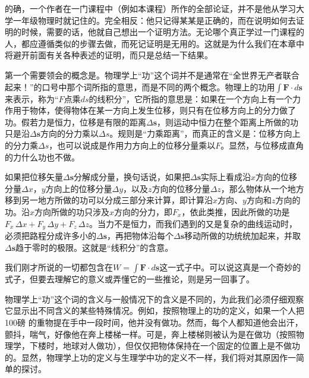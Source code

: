 \documentclass[12pt,oneside]{book}
\providecommand{\FLPvec}[1]{\boldsymbol{#1}}
\providecommand{\FLPF}[0]{\FLPvec{F}}
\providecommand{\FLPs}[0]{\FLPvec{s}}
\begin{document}
的确，一个作者在一门课程中（例如本课程）所作的全部论证，并不是他从学习大学一年级物理时就记住的。完全相反：他只记得某某是正确的，而在说明如何去证明的时候，需要的话，他就自己想出一个证明方法。无论哪个真正学过一门课程的人，都应遵循类似的步骤去做，而死记证明是无用的。这就是为什么我们在本章中将避开前面有关各种表述的证明，而只是总结一下结果。


第一个需要领会的概念是。物理学上“功”这个词并不是通常在“全世界无产者联合起来！”的口号中那个词所指的意思，而是不同的两个概念。物理上的功用$\int\FLPF\cdot d\FLPs$来表示，称为“$F  $点乘$ ds $的线积分”，它所指的意思是：如果在一个方向上有一个力作用于物体，使得物体在某一方向上发生位移，则只有在位移方向上的分力做了功。假若力是恒力，位移是有限的距离$ \Delta\FLPs $，则运动中恒力在整个距离上所做的功只是沿$ \Delta\FLPs $方向的分力乘以$ \Delta s $。规则是“力乘距离”，而真正的含义是：位移方向上的分力乘$\Delta s$，也可以说成是作用力方向上的位移分量乘以$F$。显然，与位移成直角的力什么功也不做。


如果把位移矢量$\Delta\FLPs$分解成分量，换句话说，如果把$\Delta\FLPs$实际上看成沿$x$方向的位移分量$\Delta x$，$y$方向上的位移分量$\Delta y$，以及$z$方向的位移分量$\Delta z$，那么物体从一个地方移到另一地方所做的功可以分成三部分来计算，即计算沿$x$方向、$y$方向和$z$方向的功。沿$x$方向所做的功只涉及$x$方向的分力，即$F_x$，依此类推，因此所做的功是$F_x\,\Delta x + F_y\,\Delta y + F_z\,\Delta z$。当力不是恒力，而我们遇到的又是复杂的曲线运动时，必须把路程分成许多小的$\Delta\FLPs$，再把物体沿每个$\Delta\FLPs$移动所做的功统统加起来，并取$\Delta\FLPs$趋于零时的极限。这就是“线积分”的含意。


我们刚才所说的一切都包含在$W=\int\FLPF\cdot d\FLPs$这一式子中。可以说这真是一个奇妙的式子，但要去理解它的意义或弄懂它的一些推论，则是另一回事了。


物理学上“功”这个词的含义与一般情况下的含义是不同的，为此我们必须仔细观察它显示出不同含义的某些特殊情况。例如，按照物理上的功的定义，如果一个人把 100磅 的重物提在手中一段时间，他并没有做功。然而，每个人都知道他会出汗，颤抖，喘气，好像他在奔上楼梯一样。可是，奔上楼梯则被认为是在做功（按照物理学，下楼时，地球对人做功），但仅仅把物体保持在一个固定的位置上是不做功的。显然，物理学上功的定义与生理学中功的定义不一样，我们将对其原因作一简单的探讨。
\end{document}

